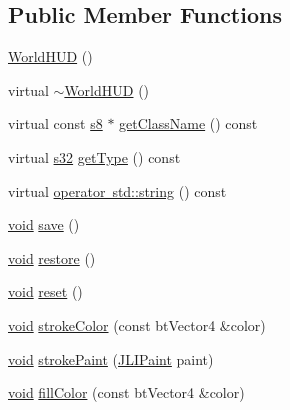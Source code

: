 \subsection*{Public Member Functions}
\begin{DoxyCompactItemize}
\item 
\mbox{\hyperlink{classnjli_1_1_world_h_u_d_aaa03dd572c9d1a44922a1c200d4192fe}{World\+H\+UD}} ()
\item 
virtual \mbox{\hyperlink{classnjli_1_1_world_h_u_d_a5c610e5e8a9c478d241b0a484a672de7}{$\sim$\+World\+H\+UD}} ()
\item 
virtual const \mbox{\hyperlink{_util_8h_a2ff401e087cf786c38a6812723e94473}{s8}} $\ast$ \mbox{\hyperlink{classnjli_1_1_world_h_u_d_a77e75b1900ecb22d4e07a46b430f29d3}{get\+Class\+Name}} () const
\item 
virtual \mbox{\hyperlink{_util_8h_aa62c75d314a0d1f37f79c4b73b2292e2}{s32}} \mbox{\hyperlink{classnjli_1_1_world_h_u_d_a2e73bd1fd7956213af66dd0bb4692761}{get\+Type}} () const
\item 
virtual \mbox{\hyperlink{classnjli_1_1_world_h_u_d_a0125b46badab61261aa8240b0255d171}{operator std\+::string}} () const
\item 
\mbox{\hyperlink{_thread_8h_af1e856da2e658414cb2456cb6f7ebc66}{void}} \mbox{\hyperlink{classnjli_1_1_world_h_u_d_a642375ec9d4204c4e30ecd1c514db7a7}{save}} ()
\item 
\mbox{\hyperlink{_thread_8h_af1e856da2e658414cb2456cb6f7ebc66}{void}} \mbox{\hyperlink{classnjli_1_1_world_h_u_d_a9eb79412a9e58ed635026ea42ce3b56e}{restore}} ()
\item 
\mbox{\hyperlink{_thread_8h_af1e856da2e658414cb2456cb6f7ebc66}{void}} \mbox{\hyperlink{classnjli_1_1_world_h_u_d_a53e9e3898ebb81ba221c710380b554c0}{reset}} ()
\item 
\mbox{\hyperlink{_thread_8h_af1e856da2e658414cb2456cb6f7ebc66}{void}} \mbox{\hyperlink{classnjli_1_1_world_h_u_d_aec50b89dcd5f2d5d43248e67419e7665}{stroke\+Color}} (const bt\+Vector4 \&color)
\item 
\mbox{\hyperlink{_thread_8h_af1e856da2e658414cb2456cb6f7ebc66}{void}} \mbox{\hyperlink{classnjli_1_1_world_h_u_d_aa348c8907633ae02aff28a856f75cb45}{stroke\+Paint}} (\mbox{\hyperlink{structnjli_1_1_j_l_i_paint}{J\+L\+I\+Paint}} paint)
\item 
\mbox{\hyperlink{_thread_8h_af1e856da2e658414cb2456cb6f7ebc66}{void}} \mbox{\hyperlink{classnjli_1_1_world_h_u_d_acb11035d988c1f295e3923682a6bbced}{fill\+Color}} (const bt\+Vector4 \&color)
\item 

\end{DoxyCompactItemize}

